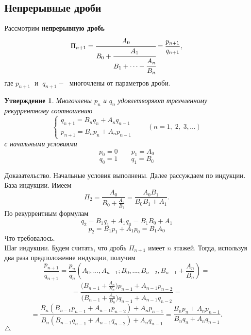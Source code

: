 \documentclass[12 pt, a4 paper]{article}
\theoremstyle{plain}   \newtheorem{Pro}{Задача}
\newtheorem{Sta}{Утверждение}
\begin{document}
\subsection{Непрерывные дроби}
Рассмотрим
{\bfseries непрерывную дробь}
\begin{equation*}
  \Pi _{n+1} =
    \cfrac{A_0 }{B_0 +
	 \cfrac{A_1 }{B_1 + \dotsb +
	  \cfrac{A_n }{B_n
	   }}}
   = \frac{ p_{n+1}}{q_{n+1}},
\end{equation*}
где
$ p_{n+1} \; $
и
$ \; q_{n+1} - \; $
многочлены от параметров дроби.
\begin{Sta}
Многочлены
$ p_n $
и
$ q_n $
удовлетворяют трехчленному рекуррентному соотношению
\begin{equation*}
  \begin{cases}
    q_{n+1}=B_n q_n + A_n q_{n-1}\\
	p_{n+1}=B_n p_n + A_n p_{n-1}
  \end{cases}
  \qquad ( n=1, \; 2, \; 3,...)
\end{equation*}
с начальными условиями
$$
  p_0 =0 \quad \quad p_1 =A_0
$$
$$
  q_0 =1 \quad \quad q_1 =B_0
$$
\end{Sta}
{\Large Доказательство.}
Начальные условия выполнены. Далее рассуждаем по индукции.\\
База индукции. Имеем
$$
  \Pi _2 = \frac{A_0}{B_0 +\frac{A_1}{B_1}}=
  \frac{A_0 B_1 }{B_0 B_1 + A_1 }.
$$
По рекуррентным формулам
$$
  q_2 =B_1 q_1 +A_1 q_0 =B_1 B_0 +A_1
$$
$$
  p_2 =B_1 p_1 +A_1 p_0 =B_1 A_0
$$
Что требовалось.
\\
Шаг индукции. Будем считать, что дробь
$ \Pi _{n+1} $
имеет
$ n $
этажей. Тогда, используя два раза предположение индукции, получим
$$
  \frac{p_{n+1}}{q_{n+1}}=
  \frac{p_n}{q_n}(A_0 ,...,A_{n-1}; B_0 ,..., B_{n-2},
  B_{n-1}+ \frac{A_n}{B_n})=
$$
$$
  =\frac{\bigl ( B_{n-1} + \frac{A_n}{B_n} \bigr )
  p_{n-1} + A_{n-1} p_{n-2} }
  {\bigl ( B_{n-1} + \frac{A_n}{B_n} \bigr )
  q_{n-1} + A_{n-1} q_{n-2} } =
$$
$$
  = \frac{B_n ( B_{n-1} p_{n-1}  + A_{n-1} p_{n-2} )
  +A_n p_{n-1} }
  {B_n ( B_{n-1} q_{n-1} + A_{n-1} q_{n-2} )
  +A_n q_{n-1} }=
  \frac{B_n p_n + A_n p_{n-1} }
  {B_n q_n + A_n q_{n-1} }.
$$
$ \triangle $
\\
\end{document}
